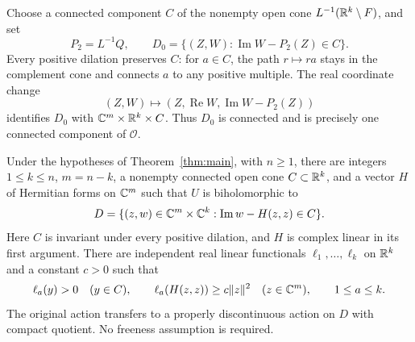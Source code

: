 Choose a connected component $C$ of the nonempty open cone
$L^{-1}(\mathbb R^k\setminus F)$, and set
\begin{equation}
\label{eq:preliminary-model}
 P_2=L^{-1}Q,\qquad
 D_0=\{(Z,W):\operatorname{Im}W-P_2(Z)\in C\}.
\end{equation}
Every positive dilation preserves $C$: for $a\in C$, the path
$r\mapsto ra$ stays in the complement cone and connects $a$ to any
positive multiple.  The real coordinate change
\[
 (Z,W)\longmapsto
       (Z,\operatorname{Re}W,\operatorname{Im}W-P_2(Z))
\]
identifies $D_0$ with $\mathbb C^m\times\mathbb R^k\times C$.  Thus $D_0$ is connected
and is precisely one connected component of $\mathcal O$.

\begin{theorem}
\label{thm:quadratic-model}
Under the hypotheses of Theorem~\ref{thm:main}, with $n\ge1$, there are
integers $1\le k\le n$, $m=n-k$, a nonempty connected open cone
$C\subset\mathbb R^k$, and a vector $H$ of Hermitian forms on $\mathbb C^m$ such that
$U$ is biholomorphic to
\begin{equation}
\label{eq:model}
 D=\{(z,w)\in\mathbb C^m\times\mathbb C^k:
               \operatorname{Im}w-H(z,z)\in C\}.
\end{equation}
Here $C$ is invariant under every positive dilation, and $H$ is complex
linear in its first argument.  There are independent real linear
functionals $\ell_1,\ldots,\ell_k$ on $\mathbb R^k$ and a constant $c>0$ such
that
\begin{equation}
\label{eq:strict-supports}
 \ell_a(y)>0\quad(y\in C),\qquad
 \ell_a(H(z,z))\ge c\lVert z\rVert^2
 \quad(z\in\mathbb C^m),\qquad 1\le a\le k.
\end{equation}
The original action transfers to a properly discontinuous action on $D$
with compact quotient.  No freeness assumption is required.
\end{theorem}

